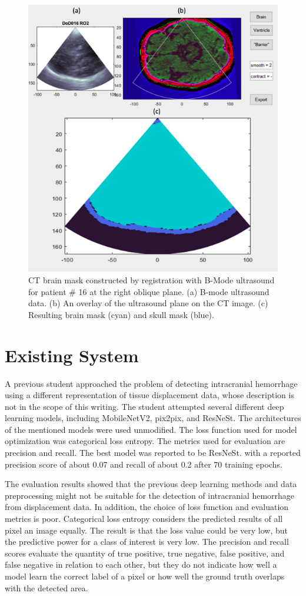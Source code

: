 \documentclass [11pt, proquest] {uwthesis}[2020/02/24]
\begin{document}
\begin{figure}
  \centering
  \includegraphics[width=0.6\linewidth]{figures/registration_output.png}
  \caption{CT brain mask constructed by registration with B-Mode ultrasound for patient \# 16 at the right oblique plane. 
  (a) B-mode ultrasound data. (b) An overlay of the ultrasound plane on the CT image. 
  (c) Resulting brain mask (cyan) and skull mask (blue).}
  \label{registration_output}
\end{figure}


\section{Existing System}

A previous student approached the problem of detecting intracranial hemorrhage using a different representation of 
tissue displacement data, whose description is not in the scope of this writing. The student attempted several different 
deep learning models, including MobileNetV2\cite{sandler_mobilenetv2_2019}, pix2pix\cite{isola_image_image_2018}, 
and ResNeSt\cite{zhang_resnest_2020}. The architectures of the mentioned models were used unmodified. The loss function used for model 
optimization was categorical loss entropy. The metrics used for evaluation are precision and recall. The best model 
was reported to be ResNeSt. with a reported precision score of about 0.07 and recall of about 0.2 after 70 training epochs.

The evaluation results showed that the previous deep learning methods and data preprocessing might not be suitable for the 
detection of intracranial hemorrhage from displacement data. In addition, the choice of loss function and evaluation metrics 
is poor. Categorical loss entropy considers the predicted results of all pixel an image equally. The result is that the loss 
value could be very low, but the predictive power for a class of interest is very low. The precision and recall scores evaluate 
the quantity of true positive, true negative, false positive, and false negative in relation to each other, but they do not 
indicate how well a model learn the correct label of a pixel or how well the ground truth overlaps with the detected area.
\end{document}
